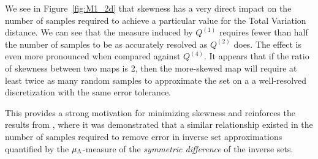 We see in Figure~\ref{fig:M1_2d} that skewness has a very direct impact on the number of samples required to achieve a particular value for the Total Variation distance. 
We can see that the measure induced by $Q^{(1)}$ requires fewer than half the number of samples to be as accurately resolved as $Q^{(2)}$ does. 
The effect is even more pronounced when compared against $Q^{(4)}$.
It appears that if the ratio of skewness between two maps is 2, then the more-skewed map will require at least twice as many random samples to approximate the set on a a well-resolved discretization with the same error tolerance.

This provides a strong motivation for minimizing skewness and reinforces the results from \cite{BPW_2015}, where it was demonstrated that a similar relationship existed in the number of samples required to remove error in inverse set approximations quantified by the $\mu_{\Lambda}$-measure of the {\em symmetric difference} of the inverse sets.



